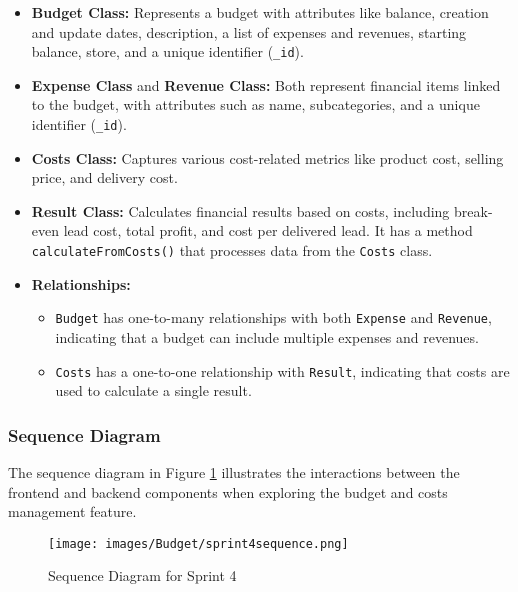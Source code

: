 \begin{itemize}
    \item \textbf{Budget Class:} Represents a budget with attributes like balance, creation and update dates, description, a list of expenses and revenues, starting balance, store, and a unique identifier (\texttt{\_id}).
    
    \item \textbf{Expense Class} and \textbf{Revenue Class:} Both represent financial items linked to the budget, with attributes such as name, subcategories, and a unique identifier (\texttt{\_id}).

    \item \textbf{Costs Class:} Captures various cost-related metrics like product cost, selling price, and delivery cost.

    \item \textbf{Result Class:} Calculates financial results based on costs, including break-even lead cost, total profit, and cost per delivered lead. It has a method \texttt{calculateFromCosts()} that processes data from the \texttt{Costs} class.
    
    \item \textbf{Relationships:}
    \begin{itemize}
        \item \texttt{Budget} has one-to-many relationships with both \texttt{Expense} and \texttt{Revenue}, indicating that a budget can include multiple expenses and revenues.
        \item \texttt{Costs} has a one-to-one relationship with \texttt{Result}, indicating that costs are used to calculate a single result.
    \end{itemize}
\end{itemize}

\subsubsection{Sequence Diagram}

The sequence diagram in Figure \ref{fig:sequence_sprint4} illustrates the interactions between the frontend and backend components when exploring the budget and costs management feature.

\begin{figure}[H]
    \centering
    \texttt{[image: images/Budget/sprint4sequence.png]}
    \caption{Sequence Diagram for Sprint 4}
    \label{fig:sequence_sprint4}
\end{figure}

